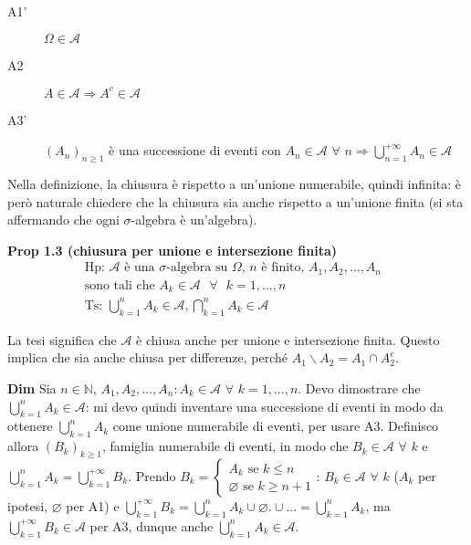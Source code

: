 \documentclass{article}
\begin{document}
\begin{description}
\item[A1'] $\Omega \in \mathcal{A}$

\item[A2] $A\in \mathcal{A}\Longrightarrow A^{c}\in \mathcal{A}$

\item[A3'] $\left( A_{n}\right) _{n\geq 1}$ \`{e} una successione di eventi
con $A_{n}\in \mathcal{A}$ $\forall $ $n\Longrightarrow
\bigcup_{n=1}^{+\infty }A_{n}\in \mathcal{A}$
\end{description}

Nella definizione, la chiusura \`{e} rispetto a un'unione numerabile, quindi
infinita: \`{e} per\`{o} naturale chiedere che la chiusura sia anche
rispetto a un'unione finita (si sta affermando che ogni $\sigma $-algebra 
\`{e} un'algebra).

\textbf{Prop 1.3 (chiusura per unione e intersezione finita)}%
\begin{gather*}
\text{Hp: }\mathcal{A}\text{ \`{e} una }\sigma \text{-algebra su }\Omega 
\text{, }n\text{ \`{e} finito, }A_{1},A_{2},...,A_{n}\text{ } \\
\text{sono tali che }A_{k}\in \mathcal{A}\text{ }\forall \text{ }k=1,...,n \\
\text{Ts: }\bigcup_{k=1}^{n}A_{k}\in \mathcal{A},\bigcap_{k=1}^{n}A_{k}\in 
\mathcal{A}
\end{gather*}

La tesi significa che $\mathcal{A}$ \`{e} chiusa anche per unione e
intersezione finita. Questo implica che sia anche chiusa per differenze,
perch\'{e} $A_{1}\backslash A_{2}=A_{1}\cap A_{2}^{c}$.

\textbf{Dim} Sia $n\in 
\mathbb{N}
$, $A_{1},A_{2},...,A_{n}:A_{k}\in \mathcal{A}$ $\forall $ $k=1,...,n$. Devo
dimostrare che $\bigcup_{k=1}^{n}A_{k}\in \mathcal{A}$: mi devo quindi
inventare una successione di eventi in modo da ottenere $%
\bigcup_{k=1}^{n}A_{k}$ come unione numerabile di eventi, per usare A3.
Definisco allora $\left( B_{k}\right) _{k\geq 1}$, famiglia numerabile di
eventi, in modo che $B_{k}\in \mathcal{A}$ $\forall $ $k$ e $%
\bigcup_{k=1}^{n}A_{k}=\bigcup_{k=1}^{+\infty }B_{k}$. Prendo $B_{k}=\left\{ 
\begin{array}{c}
A_{k}\text{ se }k\leq n \\ 
\varnothing \text{ se }k\geq n+1%
\end{array}%
\right. $: $B_{k}\in \mathcal{A}$ $\forall $ $k$ ($A_{k}$ per ipotesi, $%
\varnothing $ per A1) e $\bigcup_{k=1}^{+\infty
}B_{k}=\bigcup_{k=1}^{n}A_{k}\cup \varnothing .\cup
...=\bigcup_{k=1}^{n}A_{k}$, ma $\bigcup_{k=1}^{+\infty }B_{k}\in \mathcal{A}
$ per A3, dunque anche $\bigcup_{k=1}^{n}A_{k}\in \mathcal{A}$.
\end{document}

